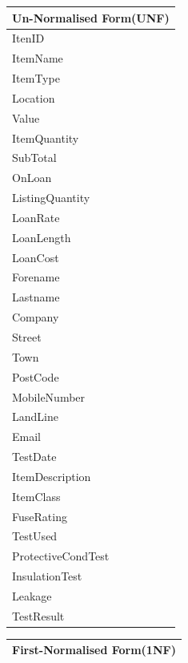 \begin{center}
    \begin{tabular}{|p{4cm}|}
        \hline
        \textbf{Un-Normalised Form(UNF)}\\ \hline
        ItenID\\ \hline
        ItemName\\ \hline
        ItemType\\ \hline
        Location\\ \hline
        Value\\ \hline
        ItemQuantity\\ \hline
        SubTotal\\ \hline
        OnLoan\\ \hline
        ListingQuantity\\ \hline
        LoanRate\\ \hline
        LoanLength\\ \hline
        LoanCost\\ \hline
        Forename\\ \hline
        Lastname\\ \hline
        Company\\ \hline
        Street\\ \hline
        Town\\ \hline
        PostCode\\ \hline
        MobileNumber\\ \hline
        LandLine\\ \hline
        Email\\ \hline
        TestDate\\ \hline
        ItemDescription\\ \hline
        ItemClass\\ \hline
        FuseRating\\ \hline
        TestUsed\\ \hline
        ProtectiveCondTest\\ \hline
        InsulationTest\\ \hline
        Leakage\\ \hline
        TestResult\\ \hline
    \end{tabular}
\end{center}

\newpage

\begin{center}
    \begin{tabular}{|p{4cm}|}
        \hline
        \textbf{First-Normalised Form(1NF)}\\ \hline

    \end{tabular}
\end{center}


